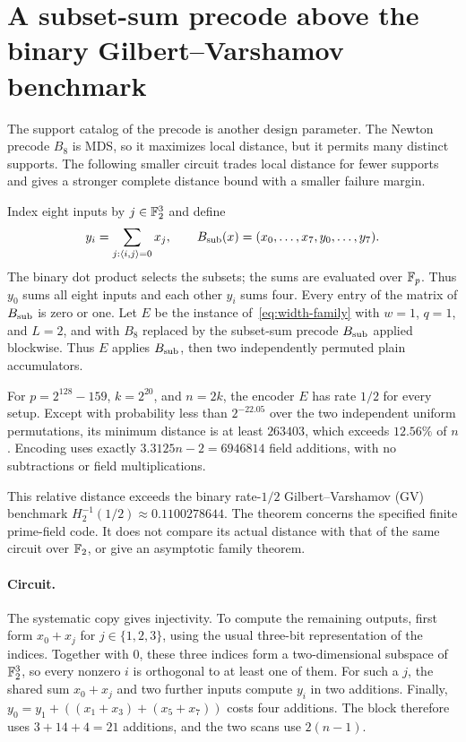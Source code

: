 \section{A subset-sum precode above the binary Gilbert--Varshamov benchmark}
\label{app:subset-sum-gv}

The support catalog of the precode is another design parameter. The
Newton precode $B_8$ is MDS, so it maximizes local distance, but it
permits many distinct supports. The following smaller circuit trades
local distance for fewer supports and gives a stronger complete distance
bound with a smaller failure margin.

Index eight inputs by $j\in\mathbb F_2^3$ and define
\[
 y_i=\sum_{j:\langle i,j\rangle=0}x_j,\qquad
 B_{\rm sub}(x)=(x_0,\ldots,x_7,y_0,\ldots,y_7).
\]
The binary dot product selects the subsets; the sums are evaluated over
$\mathbb F_p$. Thus $y_0$ sums all eight inputs and each other $y_i$ sums four.
Every entry of the matrix of $B_{\rm sub}$ is zero or one. Let $E$ be
the instance of~\eqref{eq:width-family} with $w=1$, $q=1$, and $L=2$,
and with $B_8$ replaced by the subset-sum precode $B_{\rm sub}$ applied
blockwise. Thus $E$ applies $B_{\rm sub}$, then two independently
permuted plain accumulators.

\begin{theorem}\label{thm:subset-sum-gv}
For $p=2^{128}-159$, $k=2^{20}$, and $n=2k$, the encoder $E$ has rate
$1/2$ for every setup. Except with probability less than $2^{-22.05}$
over the two independent uniform permutations, its minimum distance is
at least $263403$, which exceeds $12.56\%$ of $n$. Encoding uses exactly
$3.3125n-2=6946814$ field additions, with no subtractions or field
multiplications.
\end{theorem}

This relative distance exceeds the binary rate-$1/2$
Gilbert--Varshamov (GV) benchmark $H_2^{-1}(1/2)\approx0.1100278644$.
The theorem concerns the specified finite prime-field code. It does not
compare its actual distance with that of the same circuit over $\mathbb F_2$,
or give an asymptotic family theorem.

\paragraph{Circuit.}
The systematic copy gives injectivity. To compute the remaining outputs,
first form $x_0+x_j$ for $j\in\{1,2,3\}$, using the usual three-bit
representation of the indices. Together with $0$, these three indices
form a two-dimensional subspace of $\mathbb F_2^3$, so every nonzero $i$ is
orthogonal to at least one of them. For such a $j$, the shared sum
$x_0+x_j$ and two further inputs compute $y_i$ in two additions.
Finally, $y_0=y_1+((x_1+x_3)+(x_5+x_7))$ costs four additions. The
block therefore uses $3+14+4=21$ additions, and the two scans use
$2(n-1)$.

